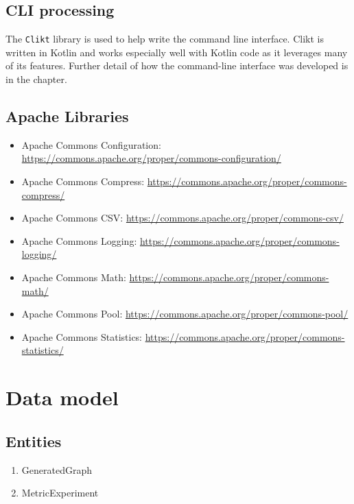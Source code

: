     \subsection{CLI processing}
        
        The \texttt{Clikt} library is used to help write the command line interface. Clikt is written in Kotlin and works especially well with Kotlin code as it leverages many of its features. Further detail of how the command-line interface was developed is in the  chapter.
    
    \subsection{Apache Libraries}
        
            \begin{itemize}
                \item Apache Commons Configuration: \url{https://commons.apache.org/proper/commons-configuration/}
                \item Apache Commons Compress: \url{https://commons.apache.org/proper/commons-compress/}
                \item Apache Commons CSV: \url{https://commons.apache.org/proper/commons-csv/}
                \item Apache Commons Logging: \url{https://commons.apache.org/proper/commons-logging/}
                \item Apache Commons Math: \url{https://commons.apache.org/proper/commons-math/}
                \item Apache Commons Pool: \url{https://commons.apache.org/proper/commons-pool/}
                \item Apache Commons Statistics: \url{https://commons.apache.org/proper/commons-statistics/}
            \end{itemize}
    


\section{Data model}

    \subsection{Entities}
    \begin{enumerate}
        \item GeneratedGraph
        \item MetricExperiment
    \end{enumerate}
    
